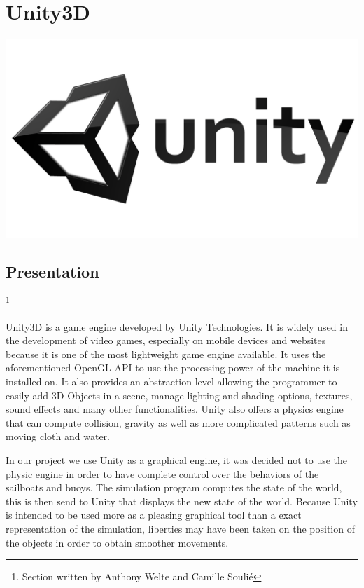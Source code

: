\documentclass[a4paper]{report}
\begin{document}
\section{Unity3D}
\begin{center}
\includegraphics[scale=0.05]{image/unity-logo.png}
\end{center}
\subsection{Presentation}
\footnote{Section written by Anthony Welte and Camille Soulié}

Unity3D is a game engine developed by Unity Technologies. It is widely used in the development of video games, especially on mobile devices and websites because it is one of the most lightweight game engine available. It uses the aforementioned OpenGL API to use the processing power of the machine it is installed on. It also provides an abstraction level allowing the programmer to easily add 3D Objects in a scene, manage lighting and shading options, textures, sound effects and many other functionalities. Unity also offers a physics engine that can compute collision, gravity as well as more complicated patterns such as moving cloth and water. 

In our project we use Unity as a graphical engine, it was decided not to use the physic engine in order to have complete control over the behaviors of the sailboats and buoys. The simulation program computes the state of the world, this is then send to Unity that displays the new state of the world. Because Unity is intended to be used more as a pleasing graphical tool than a exact representation of the simulation, liberties may have been taken on the position of the objects in order to obtain smoother movements.
\end{document}
